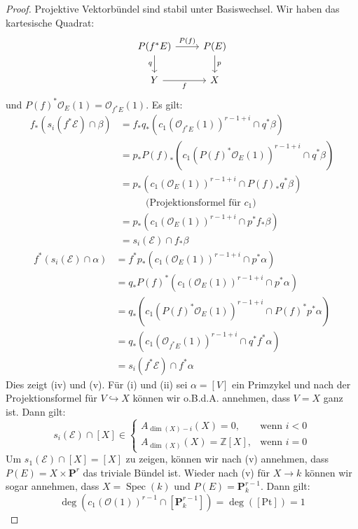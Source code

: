 \documentclass[10pt,a4paper]{article}
\begin{document}
\begin{proof}
Projektive Vektorbündel sind stabil unter Basiswechsel. Wir haben das kartesische Quadrat:
\[ \begin{tikzcd}
P(f^\ast E) \rar["P(f)"]\dar["q"'] & P(E) \dar["p"] \\
Y \rar["f"'] & X
\end{tikzcd} \]
und $P(f)^\ast\mathcal{O}_E(1) = \mathcal{O}_{f^\ast E}(1)$. Es gilt:
\begin{align*}
f_\ast(s_i(f^\ast\mathcal{E})\cap\beta) &= f_\ast q_\ast(c_1(\mathcal{O}_{f^\ast E}(1))^{r-1+i}\cap q^\ast \beta)\\
&= p_\ast P(f)_\ast (c_1(P(f)^\ast\mathcal{O}_E(1))^{r-1+i}\cap q^\ast\beta)\\
&= p_\ast(c_1(\mathcal{O}_E(1))^{r-1+i}\cap P(f)_\ast q^\ast\beta) \\
&\phantom{==} \text{(Projektionsformel für $c_1$)}\\
&= p_\ast(c_1(\mathcal{O}_E(1))^{r-1+i}\cap p^\ast f_\ast\beta)\\
&= s_i(\mathcal{E})\cap f_\ast\beta
\end{align*}
\begin{align*}
f^\ast(s_i(\mathcal{E})\cap\alpha) &= f^\ast p_\ast(c_1(\mathcal{O}_E(1))^{r-1+i}\cap p^\ast\alpha)\\
&= q_\ast P(f)^\ast(c_1(\mathcal{O}_E(1))^{r-1+i}\cap p^\ast \alpha)\\
&= q_\ast(c_1(P(f)^\ast\mathcal{O}_{E}(1))^{r-1+i}\cap P(f)^\ast p^\ast \alpha)\\
&= q_\ast(c_1(\mathcal{O}_{f^\ast E}(1))^{r-1+i}\cap q^\ast f^\ast \alpha)\\
&= s_i(f^\ast\mathcal{E})\cap f^\ast\alpha
\end{align*}
Dies zeigt (iv) und (v). Für (i) und (ii) sei $\alpha = [V]$ ein Primzykel und nach der Projektionsformel für $V\hookrightarrow X$ können wir o.B.d.A. annehmen, dass $V=X$ ganz ist. Dann gilt:
\[s_i(\mathcal{E})\cap [X] \in \begin{cases}
A_{\dim(X)-i}(X) = 0, & \text{wenn $i<0$}\\
A_{\dim(X)}(X) = \mathbb{Z}[X], & \text{wenn $i = 0$}
\end{cases}
\]
Um $s_1(\mathcal{E})\cap [X] = [X]$ zu zeigen, können wir nach (v) annehmen, dass $P(E)=X\times\mathbf{P}^r$ das triviale Bündel ist. Wieder nach (v) für $X\to k$ können wir sogar annehmen, dass $X=\operatorname{Spec}(k)$ und $P(E)=\mathbf{P}_k^{r-1}$. Dann gilt:
\[ \deg(c_1(\mathcal{O}(1))^{r-1}\cap [\mathbf{P}_k^{r-1}]) = \deg([\mathrm{Pt}]) = 1 \]

\end{proof}
\end{document}
